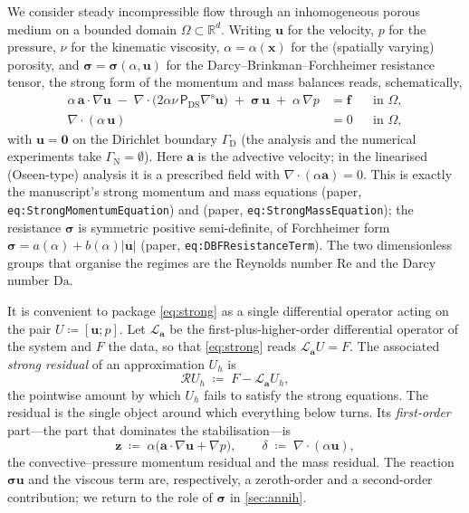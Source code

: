 \documentclass[11pt]{article}
\newcommand{\Reyn}{\mathrm{Re}}
\newcommand{\Damk}{\mathrm{Da}}
\newcommand{\ViscProj}{\mathsf{P}_{\mathrm{DS}}}
\newcommand{\bu}{\boldsymbol{u}}
\newcommand{\bef}{\boldsymbol{f}}
\newcommand{\bx}{\boldsymbol{x}}
\newcommand{\bsig}{\boldsymbol{\sigma}}
\newcommand{\ba}{\boldsymbol{a}}
\newcommand{\bz}{\boldsymbol{z}}
\newcommand{\bzero}{\boldsymbol{0}}
\newcommand{\grad}{\nabla}
\newcommand{\divg}{\nabla\!\cdot\!}
\newcommand{\Lop}{\mathcal{L}}
\newcommand{\Rop}{\mathcal{R}}
\theoremstyle{plain}
\theoremstyle{definition}
\theoremstyle{remark}
\begin{document}
We consider steady incompressible flow through an inhomogeneous porous
medium on a bounded domain $\Omega\subset\mathbb{R}^d$. Writing $\bu$
for the velocity, $p$ for the pressure, $\nu$ for the kinematic
viscosity, $\alpha=\alpha(\bx)$ for the (spatially varying) porosity,
and $\bsig=\bsig(\alpha,\bu)$ for the Darcy--Brinkman--Forchheimer
resistance tensor, the strong form of the momentum and mass balances
reads, schematically,
%
\begin{subequations}\label{eq:strong}
\begin{align}
  \alpha\,\ba\cdot\grad\bu
  \;-\;\divg\!\bigl(2\alpha\nu\,\ViscProj\grad^{\mathrm s}\bu\bigr)
  \;+\;\bsig\,\bu \;+\;\alpha\,\grad p
    &= \bef && \text{in }\Omega,
    \label{eq:strongmom}\\[2pt]
  \divg(\alpha\,\bu) &= 0 && \text{in }\Omega,
    \label{eq:strongmass}
\end{align}
\end{subequations}
%
with $\bu=\bzero$ on the Dirichlet boundary $\Gamma_{\mathrm D}$
(the analysis and the numerical experiments take
$\Gamma_{\mathrm N}=\emptyset$). Here $\ba$ is the advective velocity;
in the linearised (Oseen-type) analysis it is a prescribed field with
$\divg(\alpha\ba)=0$. This is exactly the manuscript's strong momentum
and mass equations (paper, \texttt{eq:StrongMomentumEquation}) and
(paper, \texttt{eq:StrongMassEquation}); the resistance $\bsig$ is
symmetric positive semi-definite, of Forchheimer form
$\bsig=a(\alpha)+b(\alpha)\lvert\bu\rvert$ (paper,
\texttt{eq:DBFResistanceTerm}). The two dimensionless groups that
organise the regimes are the Reynolds number $\Reyn$ and the Darcy
number $\Damk$.

It is convenient to package \cref{eq:strong} as a single differential
operator acting on the pair $U\coloneqq[\bu;p]$. Let $\Lop_{\ba}$ be the
first-plus-higher-order differential operator of the system and $F$ the
data, so that \cref{eq:strong} reads $\Lop_{\ba}U=F$. The associated
\emph{strong residual} of an approximation $U_h$ is
%
\begin{equation}\label{eq:residualdef}
  \Rop U_h \;\coloneqq\; F-\Lop_{\ba}U_h ,
\end{equation}
%
the pointwise amount by which $U_h$ fails to satisfy the strong
equations. The residual is the single object around which everything
below turns. Its \emph{first-order} part---the part that dominates the
stabilisation---is
%
\begin{equation}\label{eq:firstorder}
  \bz \;\coloneqq\; \alpha\bigl(\ba\cdot\grad\bu+\grad p\bigr),
  \qquad
  \delta \;\coloneqq\; \divg(\alpha\bu),
\end{equation}
%
the convective--pressure momentum residual and the mass residual. The
reaction $\bsig\bu$ and the viscous term are, respectively, a
zeroth-order and a second-order contribution; we return to the role of
$\bsig$ in \cref{sec:annih}.
\end{document}
